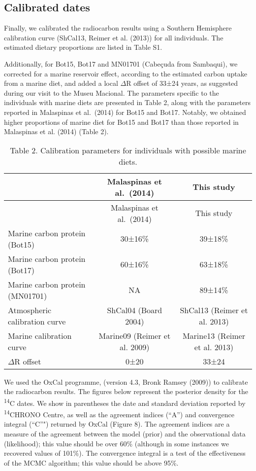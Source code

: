\documentclass[]{article}
\begin{document}
\hypertarget{calibrated-dates}{%
\subsection{Calibrated dates}\label{calibrated-dates}}

Finally, we calibrated the radiocarbon results using a Southern
Hemisphere calibration curve (ShCal13, Reimer et al. (2013)) for all
individuals. The estimated dietary proportions are listed in Table S1.

Additionally, for Bot15, Bot17 and MN01701 (Cabeçuda from Sambaqui), we
corrected for a marine reservoir effect, according to the estimated
carbon uptake from a marine diet, and added a local \(\Delta\)R offset
of 33±24 years, as suggested during our visit to the Museu Macional. The
parameters specific to the individuals with marine diets are presented
in Table 2, along with the parameters reported in Malaspinas et
al.~(2014) for Bot15 and Bot17. Notably, we obtained higher proportions
of marine diet for Bot15 and Bot17 than those reported in Malaspinas et
al. (2014) (Table 2).

\begin{longtable}[]{@{}lcc@{}}
\caption{Table 2. Calibration parameters for individuals with possible
marine diets.}\tabularnewline
\toprule
& Malaspinas et al.~(2014) & This study\tabularnewline
\midrule
\endfirsthead
\toprule
& Malaspinas et al.~(2014) & This study\tabularnewline
\midrule
\endhead
Marine carbon protein (Bot15) & 30±16\% & 39±18\%\tabularnewline
Marine carbon protein (Bot17) & 60±16\% & 63±18\%\tabularnewline
Marine carbon protein (MN01701) & NA & 89±14\%\tabularnewline
Atmospheric calibration curve & ShCal04 (Board 2004) & ShCal13 (Reimer
et al. 2013)\tabularnewline
Marine calibration curve & Marine09 (Reimer et al. 2009) & Marine13
(Reimer et al. 2013)\tabularnewline
\(\Delta\)R offset & 0±20 & 33±24\tabularnewline
\bottomrule
\end{longtable}

We used the OxCal programme, (version 4.3, Bronk Ramsey (2009)) to
calibrate the radiocarbon results. The figures below represent the
posterior density for the \textsuperscript{14}C dates. We show in
parentheses the date and standard deviation reported by
\textsuperscript{14}CHRONO Centre, as well as the agreement indices
(``A'') and convergence integral (``C''") returned by OxCal (Figure 8).
The agreement indices are a measure of the agreement between the model
(prior) and the observational data (likelihood); this value should be
over 60\% (although in some instances we recovered values of 101\%). The
convergence integral is a test of the effectiveness of the MCMC
algorithm; this value should be above 95\%.
\end{document}
